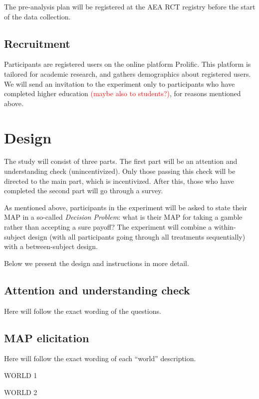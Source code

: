The pre-analysis plan will be registered at the AEA RCT registry before the start of the data collection.

\subsection{Recruitment}

Participants are registered users on the online platform Prolific.
This platform is tailored for academic research, and gathers demographics about registered users.
We will send an invitation to the experiment only to participants who have completed higher education \textcolor{red}{(maybe also to students?)}, for reasons mentioned above. 



\section{Design}

The study will consist of three parts.
The first part will be an attention and understanding check (unincentivized).
Only those passing this check will be directed to the main part, which is incentivized.
After this, those who have completed the second part will go through a survey.

As mentioned above, participants in the experiment will be asked to state their MAP in a so-called \textit{Decision Problem}: what is their MAP for taking a gamble rather than accepting a sure payoff?
The experiment will combine a within-subject design (with all participants going through all treatments sequentially) with a between-subject design.

Below we present the design and instructions in more detail.

\subsection{Attention and understanding check}

Here will follow the exact wording of the questions.

\subsection{MAP elicitation}

Here will follow the exact wording of each ``world'' description.

WORLD 1

WORLD 2


